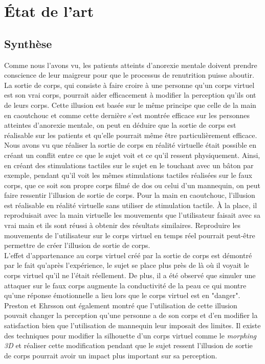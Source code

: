 \section{\'{E}tat de l'art}







\subsection{Synthèse}

Comme nous l'avons vu, les patients atteints d'anorexie mentale doivent prendre conscience de leur maigreur pour que le processus de renutrition puisse aboutir. La sortie de corps, qui consiste à faire croire à une personne qu'un corps virtuel est son vrai corps, pourrait aider efficacement à modifier la perception qu'ils ont de leurs corps. Cette illusion est basée sur le même principe que celle de la main en caoutchouc et comme cette dernière s'est montrée efficace sur les personnes atteintes d'anorexie mentale, on peut en déduire que la sortie de corps est réalisable sur les patients et qu'elle pourrait même être particulièrement efficace.\\

Nous avons vu que réaliser la sortie de corps en réalité virtuelle était possible en créant un conflit entre ce que le sujet voit et ce qu'il ressent physiquement. Ainsi, en créant des stimulations tactiles sur le sujet en le touchant avec un bâton par exemple, pendant qu'il voit les mêmes stimulations tactiles réalisées sur le faux corps, que ce soit son propre corps filmé de dos ou celui d'un mannequin, on peut faire ressentir l'illusion de sortie de corps. Pour la main en caoutchouc, l'illusion est réalisable en réalité virtuelle sans utiliser de stimulation tactile. \`{A} la place, il reproduisait avec la main virtuelle les mouvements que l'utilisateur faisait avec sa vrai main et ils sont réussi à obtenir des résultats similaires. Reproduire les mouvements de l'utilisateur sur le corps virtuel en temps réel pourrait peut-être permettre de créer l'illusion de sortie de corps. \\

L'effet d'appartenance au corps virtuel créé par la sortie de corps est démontré par le fait qu'après l'expérience, le sujet se place plus près de là où il voyait le corps virtuel qu'il ne l'était réellement. De plus, il a été observé que simuler une attaquer sur le faux corps augmente la conductivité de la peau ce qui montre qu'une réponse émotionnelle a lieu lors que le corps virtuel est en "danger". Preston et Ehrsson \cite{pr14} ont également montré que l'utilisation de cette illusion pouvait changer la perception qu'une personne a de son corps et d'en modifier la satisfaction bien que l'utilisation de mannequin leur imposait des limites. Il existe des techniques pour modifier la silhouette d'un corps virtuel comme le \emph{morphing 3D} et réaliser cette modification pendant que le sujet ressent l'illusion de sortie de corps pourrait avoir un impact plus important sur sa perception.\\

